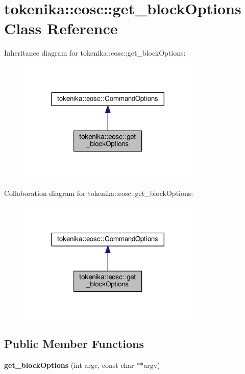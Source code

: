 \hypertarget{classtokenika_1_1eosc_1_1get__block_options}{}\section{tokenika\+:\+:eosc\+:\+:get\+\_\+block\+Options Class Reference}
\label{classtokenika_1_1eosc_1_1get__block_options}


Inheritance diagram for tokenika\+:\+:eosc\+:\+:get\+\_\+block\+Options\+:\nopagebreak
\begin{figure}[H]
\begin{center}
\leavevmode
\includegraphics[width=245pt]{classtokenika_1_1eosc_1_1get__block_options__inherit__graph}
\end{center}
\end{figure}


Collaboration diagram for tokenika\+:\+:eosc\+:\+:get\+\_\+block\+Options\+:\nopagebreak
\begin{figure}[H]
\begin{center}
\leavevmode
\includegraphics[width=245pt]{classtokenika_1_1eosc_1_1get__block_options__coll__graph}
\end{center}
\end{figure}
\subsection*{Public Member Functions}
\begin{DoxyCompactItemize}
\item 
\mbox{\label{classtokenika_1_1eosc_1_1get__block_options_a4f03cb68a98f525df8c48ea0eea0b8bf}} 
{\bfseries get\+\_\+block\+Options} (int argc, const char $\ast$$\ast$argv)
\end{DoxyCompactItemize}

